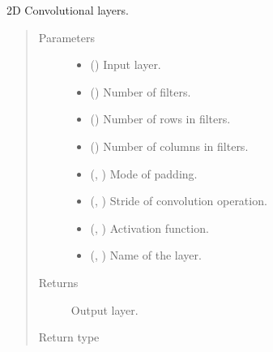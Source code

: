 \documentclass[letterpaper,10pt,english]{sphinxmanual}
\begin{document}
\begin{fulllineitems}
\label{\detokenize{models/multiresunet:models.multiresunet.conv2d_bn}}
2D Convolutional layers.
\begin{quote}\begin{description}
\item[{Parameters}] \leavevmode\begin{itemize}
\item {} 
 () \textendash{} Input layer.

\item {} 
 () \textendash{} Number of filters.

\item {} 
 () \textendash{} Number of rows in filters.

\item {} 
 () \textendash{} Number of columns in filters.

\item {} 
 (, ) \textendash{} Mode of padding.

\item {} 
 (, ) \textendash{} Stride of convolution operation.

\item {} 
 (, ) \textendash{} Activation function.

\item {} 
 (, ) \textendash{} Name of the layer.

\end{itemize}

\item[{Returns}] \leavevmode
{} \textendash{} Output layer.

\item[{Return type}] \leavevmode
{}

\end{description}\end{quote}

\end{fulllineitems}
\end{document}
